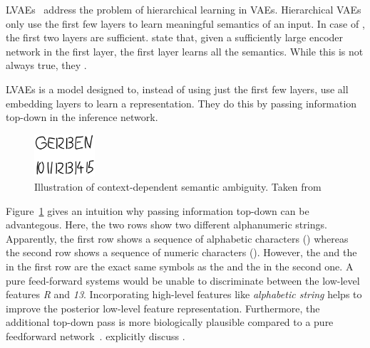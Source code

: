\aclp{LVAE}~\citep{sonderby2016ladder} address the problem of hierarchical learning in \acp{VAE}.
Hierarchical \acp{VAE} only use the first few layers to learn meaningful semantics of an input.
In case of \citet{sonderby2016ladder}, the first two layers are sufficient.
\citet{zhao2017learning} state that, given a sufficiently large encoder network in the first layer, the first layer learns all the semantics.
While this is not always true, they .

\acp{LVAE} is a model designed to, instead of using just the first few layers, use all embedding layers to learn a representation.
They do this by passing information top-down in the inference network.
\begin{figure}
    \centering
    \includegraphics[width=0.2\textwidth]{images/gerben.png}
    \caption[Context-Dependent Semantic Ambiguity]{Illustration of context-dependent semantic ambiguity. Taken from \citet[p. 61]{van2016auto}}
    \label{fig:gerben_ambiguity}
\end{figure}
Figure~\ref{fig:gerben_ambiguity} gives an intuition why passing information top-down can be advantegous.
Here, the two rows show two different alphanumeric strings.
Apparently, the first row shows a sequence of alphabetic characters () whereas the second row shows a sequence of numeric characters ().
However, the  and the  in the first row are the exact same symbols as the  and the  in the second one.
A pure feed-forward systems would be unable to discriminate between the low-level features \textit{R} and \textit{13}.
Incorporating high-level features like \textit{alphabetic string} helps to improve the posterior low-level feature representation.
Furthermore, the additional top-down pass is more biologically plausible compared to a pure feedforward network~\citep{rodriguez2015hierarchical}.
\citet{rodriguez2015hierarchical} explicitly discuss .

